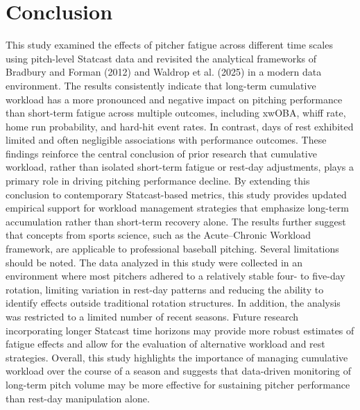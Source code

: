 \documentclass[12pt, letterpaper]{article}
\begin{document}
\section{Conclusion}
  This study examined the effects of pitcher fatigue across different time scales using pitch-level Statcast data and revisited the analytical frameworks of Bradbury and Forman (2012) and Waldrop et al. (2025) in a modern data environment. The results consistently indicate that long-term cumulative workload has a more pronounced and negative impact on pitching performance than short-term fatigue across multiple outcomes, including xwOBA, whiff rate, home run probability, and hard-hit event rates. In contrast, days of rest exhibited limited and often negligible associations with performance outcomes. These findings reinforce the central conclusion of prior research that cumulative workload, rather than isolated short-term fatigue or rest-day adjustments, plays a primary role in driving pitching performance decline. By extending this conclusion to contemporary Statcast-based metrics, this study provides updated empirical support for workload management strategies that emphasize long-term accumulation rather than short-term recovery alone. The results further suggest that concepts from sports science, such as the Acute--Chronic Workload framework, are applicable to professional baseball pitching. Several limitations should be noted. The data analyzed in this study were collected in an environment where most pitchers adhered to a relatively stable four- to five-day rotation, limiting variation in rest-day patterns and reducing the ability to identify effects outside traditional rotation structures. In addition, the analysis was restricted to a limited number of recent seasons. Future research incorporating longer Statcast time horizons may provide more robust estimates of fatigue effects and allow for the evaluation of alternative workload and rest strategies. Overall, this study highlights the importance of managing cumulative workload over the course of a season and suggests that data-driven monitoring of long-term pitch volume may be more effective for sustaining pitcher performance than rest-day manipulation alone.





\end{document}

